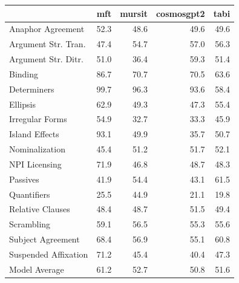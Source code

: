 \begin{tabular}{lrrrr}
\toprule
 & mft & mursit & cosmosgpt2 & tabi \\
\midrule
Anaphor Agreement & 52.3 & 48.6 & 49.6 & 49.6 \\
Argument Str. Tran. & 47.4 & 54.7 & 57.0 & 56.3 \\
Argument Str. Ditr. & 51.0 & 36.4 & 59.3 & 51.4 \\
Binding & 86.7 & 70.7 & 70.5 & 63.6 \\
Determiners & 99.7 & 96.3 & 93.6 & 58.4 \\
Ellipsis & 62.9 & 49.3 & 47.3 & 55.4 \\
Irregular Forms & 54.9 & 32.7 & 33.3 & 45.9 \\
Island Effects & 93.1 & 49.9 & 35.7 & 50.7 \\
Nominalization & 45.4 & 51.2 & 51.7 & 52.1 \\
NPI Licensing & 71.9 & 46.8 & 48.7 & 48.3 \\
Passives & 41.9 & 54.4 & 43.1 & 61.5 \\
Quantifiers & 25.5 & 44.9 & 21.1 & 19.8 \\
Relative Clauses & 48.4 & 48.7 & 51.5 & 49.4 \\
Scrambling & 59.1 & 56.5 & 55.3 & 55.6 \\
Subject Agreement & 68.4 & 56.9 & 55.1 & 60.8 \\
Suspended Affixation & 71.2 & 45.4 & 40.4 & 47.3 \\
Model Average & 61.2 & 52.7 & 50.8 & 51.6 \\
\bottomrule
\end{tabular}

